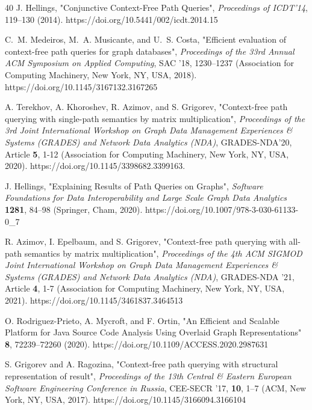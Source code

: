 \documentclass[
11pt,%
tightenlines,%
twoside,%
onecolumn,%
nobibnotes,%
nofootinbib,%
superscriptaddress,%
noshowpacs,%
longbibliography,%
centertags]%
{revtex4-2}
\begin{document}
\begin{thebibliography}{40}
J. Hellings, "{Conjunctive Context-Free Path Queries}",
\textit{Proceedings of ICDT'14}, 
119--130
(2014).
{https://doi.org/10.5441/002/icdt.2014.15}

C.~M. Medeiros, M.~A. Musicante, and U.~S. Costa,
"{Efficient evaluation of context-free path queries for graph databases}",
\textit{Proceedings of the 33rd Annual ACM Symposium on Applied Computing},
SAC '18,
1230--1237
(Association for Computing Machinery, New York, NY, USA, 2018). 
{https://doi.org/10.1145/3167132.3167265}

A. Terekhov, A. Khoroshev, R. Azimov, and S. Grigorev,
"{Context-free path querying with single-path semantics by matrix multiplication}",
\textit{Proceedings of the 3rd Joint International Workshop on Graph Data Management
Experiences \& Systems (GRADES) and Network Data Analytics (NDA)},
GRADES-NDA'20,
Article \textbf{5}, 
1-12
(Association for Computing Machinery, New York, NY, USA, 2020). 
{https://doi.org/10.1145/3398682.3399163}.

J. Hellings, "{Explaining Results of Path Queries on Graphs}",
\textit{Software Foundations for Data Interoperability and Large Scale Graph Data Analytics}
\textbf{1281},
84--98
(Springer, Cham, 2020).
{https://doi.org/10.1007/978-3-030-61133-0\_7}

R. Azimov, I. Epelbaum, and S. Grigorev,
"{Context-free path querying with all-path semantics by matrix multiplication}",
\textit{Proceedings of the 4th ACM SIGMOD Joint International Workshop on Graph Data
Management Experiences \& Systems (GRADES) and Network Data Analytics (NDA)},
GRADES-NDA '21,
Article \textbf{4}, 
1-7
(Association for Computing Machinery, New York, NY, USA, 2021).
{https://doi.org/10.1145/3461837.3464513}

O. Rodriguez-Prieto, A. Mycroft, and F. Ortin,
"{An Efficient and Scalable Platform for Java Source Code Analysis Using Overlaid Graph Representations}"
\textbf{8}, 
72239--72260 (2020). 
{https://doi.org/10.1109/ACCESS.2020.2987631}

S. Grigorev and A. Ragozina,
"{Context-free path querying with structural representation of result}",
\textit{Proceedings of the 13th Central \& Eastern European Software Engineering
Conference in Russia}, CEE-SECR '17,
\textbf{10}, 1--7
 (ACM, New York, NY, USA, 2017). 
{https://doi.org/10.1145/3166094.3166104}


\end{thebibliography}
\end{document}

